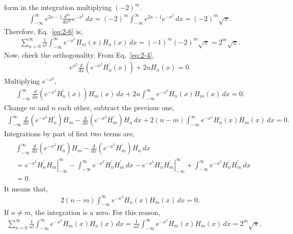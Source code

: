 \documentclass[floatfix,nofootinbib,superscriptaddress,fleqn]{revtex4-2}
\begin{document}
\begin{itemize}
form in the integration multiplying $(-2)^m$. 
\begin{align*}
  \int_{-\infty}^{\infty}e^{2x-1}\frac{d^m}{dx^m}e^{-x^2}\,dx  
  =(-2)^m\int_{-\infty}^{\infty}e^{2x-1}e^{-x^2}\,dx=(-2)^m\sqrt{\pi}. 
\end{align*}
Therefore, Eq.~\eqref{eq:2-6} is,
\begin{align*}
  \sum_{n=0}^\infty\frac{1}{n!}\int_{-\infty}^{\infty}e^{-x^2}
  H_m(x)H_n(x)\,dx
  =(-1)^m(-2)^m\sqrt{\pi}=2^m\sqrt{\pi}.
\end{align*}
Now, check the orthogonality. From Eq.~\eqref{eq:2-4},
\begin{align*}
  e^{x^2}\frac{d}{dx}\left(e^{-x^2}H^\prime_n(x)\right)+2nH_n(x)=0.
\end{align*}
Multiplying $e^{-x^2}$,
\begin{align*}
  \int_{-\infty}^\infty\frac{d}{dx}
  \left(e^{-x^2}H^\prime_n(x)\right)H_m(x)\,dx
  +2n\int_{-\infty}^\infty e^{-x^2}H_n(x)H_m(x)\,dx=0.
\end{align*}
Change $m$ and $n$ each other, subtract the previous one,
\begin{align*}
  \int_{-\infty}^\infty\frac{d}{dx}
  \left(e^{-x^2}H^\prime_n\right)H_m
  -\frac{d}{dx}\left(e^{-x^2}H^\prime_m\right)H_n\,dx
  +2(n-m)\int_{-\infty}^\infty e^{-x^2}H_n(x)H_m(x)\,dx=0.
\end{align*}
Integrations by part of first two terms are, 
\begin{align*}
  \begin{split}
    &\int_{-\infty}^\infty\frac{d}{dx}
    \left(e^{-x^2}H^\prime_n\right)H_m
    -\frac{d}{dx}\left(e^{-x^2}H^\prime_m\right)H_n\,dx \\
    &=\left.e^{-x^2}H^\prime_nH_m\right|_{-\infty}^\infty
    -\int_{-\infty}^\infty e^{-x^2}H^\prime_nH^\prime_m\,dx
    -\left.e^{-x^2}H_nH^\prime_m\right|_{-\infty}^\infty
    +\int_{-\infty}^\infty e^{-x^2}H^\prime_nH^\prime_m\,dx \\
    &=0.
  \end{split}
\end{align*}
It means that,
\begin{align*}
  2(n-m)\int_{-\infty}^\infty e^{-x^2}H_n(x)H_m(x)\,dx=0.
\end{align*}
If $n\neq m$, the integration is a zero. For this reason,
\begin{align*}
  \sum_{n=0}^\infty\frac{1}{n!}\int_{-\infty}^{\infty}
  e^{-x^2}H_m(x)H_n(x)\,dx
  =\frac{1}{m!}\int_{-\infty}^{\infty}e^{-x^2}H_m(x)H_m(x)\,dx
  =2^m\sqrt{\pi}.
\end{align*}

\end{itemize}
\end{document}
